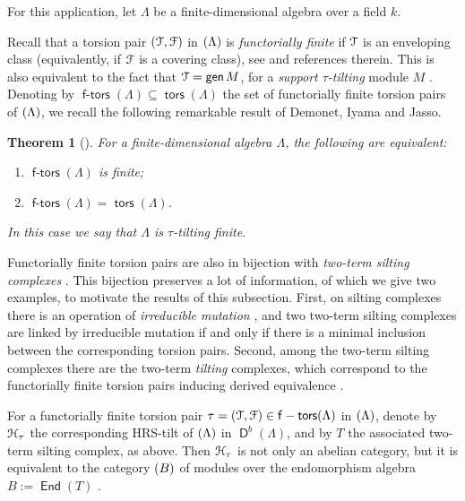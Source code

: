 \documentclass[a4paper,11pt]{amsart}
\theoremstyle{plain}
\newtheorem{thm}{Theorem}[section]
\theoremstyle{definition}
\DeclareMathOperator{\End}{\mathsf{End}}
\DeclareMathOperator{\gen}{\mathsf{gen}}
\DeclareMathOperator{\ftors}{\mathsf{f-tors}}
\DeclareMathOperator{\tors}{\mathsf{tors}}
\DeclareMathOperator{\D}{\mathsf{D}}
\let\mod\relax
\DeclareMathOperator{\mod}{\mathsf{mod}}
\begin{document}
For this application, let $\Lambda$ be a finite-dimensional algebra over a
field $k$.

Recall that a torsion pair $(\mathcal{T},\mathcal{F})$ in $\mod(\Lambda)$ is
\emph{functorially finite} if $\mathcal{T}$ is an enveloping class (equivalently,
if $\mathcal{F}$ is a covering class), see \cite[Prop.~1.1]{adac-iyam-reit-14} and
references therein. This is also equivalent to the fact
that $\Tcal=\gen M$, for a \emph{support $\tau$-tilting} module $M$
\cite[Thm.~2.7]{adac-iyam-reit-14}.
Denoting by $\ftors(\Lambda)\subseteq\tors(\Lambda)$ the set of functorially
finite torsion pairs of $\mod(\Lambda)$, we recall the following remarkable
result of Demonet, Iyama and Jasso.

\begin{thm}[{\cite[Thm.~3.8]{demo-iyam-jass-19}}]\label{thm:tau-tilting-finite}
	For a finite-dimensional algebra $\Lambda$, the following are equivalent:
	\begin{enumerate}
		\item $\ftors(\Lambda)$ is finite;
		\item $\ftors(\Lambda)=\tors(\Lambda)$.
	\end{enumerate}
	In this case we say that $\Lambda$ is \emph{$\tau$-tilting finite}.
\end{thm}

Functorially finite torsion pairs are also in bijection with \emph{two-term
silting complexes} \cite[Thms.~2.7 and~3.2]{adac-iyam-reit-14}. This bijection
preserves a lot of information, of which we give two examples, to motivate the
results of this subsection. First, on silting complexes there is an operation of
\emph{irreducible mutation} \cite{aiha-iyam-12}, and two two-term silting
complexes are linked by irreducible mutation if and only if there is a minimal
inclusion between the corresponding torsion pairs. Second, among the two-term
silting complexes there are the two-term \emph{tilting} complexes, which
correspond to the functorially finite torsion pairs inducing derived equivalence
\cite[Prop.~5.1]{psar-vito-18}.

For a functorially finite torsion pair $\tau=(\Tcal,\Fcal)\in\ftors(\Lambda)$ in
$\mod(\Lambda)$, denote by $\mathcal{H}_\tau$ the corresponding HRS-tilt of
$\mod(\Lambda)$ in $\D^b(\Lambda)$, and by $T$ the associated two-term silting
complex, as above. Then $\mathcal{H}_\tau$ is not only an abelian
category, but it is equivalent to the category $\mod(B)$ of modules over the
endomorphism algebra $B:=\End(T)$ \cite[Lemma~5.3]{koen-yang-14}.
\end{document}
